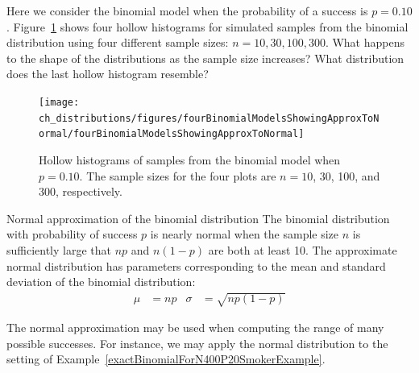 \begin{exercisewrap}
\begin{nexercise}
Here we consider the binomial model when the probability of a success is $p=0.10$. Figure~\ref{fourBinomialModelsShowingApproxToNormal} shows four hollow histograms for simulated samples from the binomial distribution using four different sample sizes: $n=10, 30, 100, 300$. What happens to the shape of the distributions as the sample size increases? What distribution does the last hollow histogram resemble?\footnotemark
\end{nexercise}
\end{exercisewrap}

\begin{figure}[h]
\centering
\texttt{[image: ch\_distributions/figures/fourBinomialModelsShowingApproxToNormal/fourBinomialModelsShowingApproxToNormal]}
\caption{Hollow histograms of samples from the binomial model when $p=0.10$. The sample sizes for the four plots are $n=10$, 30, 100, and 300, respectively.}
\label{fourBinomialModelsShowingApproxToNormal}
\end{figure}

\begin{onebox}{Normal approximation of the binomial distribution}
  The binomial distribution with probability of success
  $p$ is nearly normal when the sample size $n$ is
  sufficiently large that $np$ and $n(1-p)$ are both
  at least 10.
  The approximate normal distribution has parameters
  corresponding to the mean and standard deviation of
  the binomial distribution:\vspace{-1.5mm}
  \begin{align*}
  \mu &= np
      &\sigma& = \sqrt{np(1-p)}
  \end{align*}
\end{onebox}

The normal approximation may be used when computing the range of many possible successes. For instance, we may apply the normal distribution to the setting of Example~\ref{exactBinomialForN400P20SmokerExample}.

